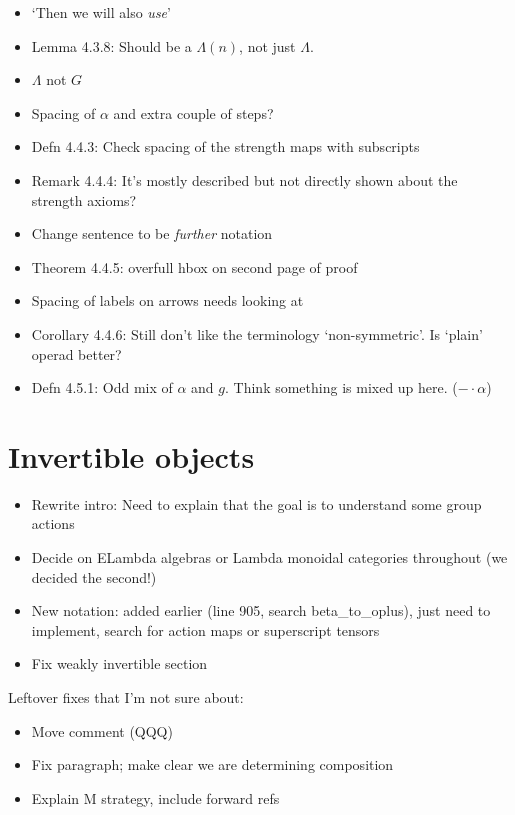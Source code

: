 \documentclass{amsart}
\begin{document}
\begin{itemize}
\item `Then we will also \textit{use}'
\item Lemma 4.3.8: Should be a $\Lambda(n)$, not just $\Lambda$.
\item $\Lambda$ not $G$
\item Spacing of $\alpha$ and extra couple of steps?
\item Defn 4.4.3: Check spacing of the strength maps with subscripts
\item Remark 4.4.4: It's mostly described but not directly shown about the strength axioms?
\item Change sentence to be \textit{further} notation
\item Theorem 4.4.5: overfull hbox on second page of proof
\item Spacing of labels on arrows needs looking at
\item Corollary 4.4.6: Still don't like the terminology `non-symmetric'. Is `plain' operad better?
\item Defn 4.5.1: Odd mix of $\alpha$ and $g$. Think something is mixed up here. ($- \cdot \alpha$)
\end{itemize}



\section{ Invertible objects}

\begin{itemize}
\item Rewrite intro: Need to explain that the goal is to understand some group actions
\item Decide on ELambda algebras or Lambda monoidal categories throughout (we decided the second!)
\item New notation: added earlier (line 905, search beta\_to\_oplus), just need to implement, search for action maps or superscript tensors
\item Fix weakly invertible section
\end{itemize}

Leftover fixes that I'm not sure about:
\begin{itemize}
\item Move comment (QQQ)
\item Fix paragraph; make clear we are determining composition
\item Explain M strategy, include forward refs
\end{itemize}
\end{document}
